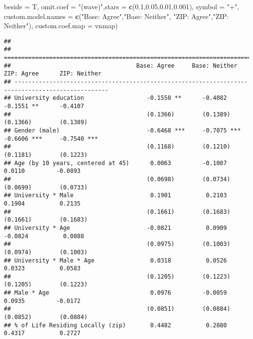 \documentclass[
]{article}
\newenvironment{Shaded}{\begin{snugshade}}{\end{snugshade}}
\newcommand{\DataTypeTok}[1]{\textcolor[rgb]{0.13,0.29,0.53}{#1}}
\newcommand{\FloatTok}[1]{\textcolor[rgb]{0.00,0.00,0.81}{#1}}
\newcommand{\KeywordTok}[1]{\textcolor[rgb]{0.13,0.29,0.53}{\textbf{#1}}}
\newcommand{\NormalTok}[1]{#1}
\newcommand{\StringTok}[1]{\textcolor[rgb]{0.31,0.60,0.02}{#1}}
\begin{document}
\begin{Shaded}
\begin{Highlighting}[]
          \DataTypeTok{beside =}\NormalTok{ T,}
          \DataTypeTok{omit.coef =} \StringTok{"(wave)"}\NormalTok{,}\DataTypeTok{stars =} \KeywordTok{c}\NormalTok{(}\FloatTok{0.1}\NormalTok{,}\FloatTok{0.05}\NormalTok{,}\FloatTok{0.01}\NormalTok{,}\FloatTok{0.001}\NormalTok{), }\DataTypeTok{symbol =} \StringTok{"+"}\NormalTok{, }
          \DataTypeTok{custom.model.names =} \KeywordTok{c}\NormalTok{(}\StringTok{"Base: Agree"}\NormalTok{,}\StringTok{"Base: Neither"}\NormalTok{,}
                                 \StringTok{"ZIP: Agree"}\NormalTok{,}\StringTok{"ZIP: Neither"}\NormalTok{),}
          \DataTypeTok{custom.coef.map =}\NormalTok{ vnmap)}
\end{Highlighting}
\end{Shaded}

\begin{verbatim}
## 
## =================================================================================================
##                                    Base: Agree     Base: Neither   ZIP: Agree      ZIP: Neither  
## -------------------------------------------------------------------------------------------------
## University education                  -0.1550 **      -0.4082         -0.1551 **      -0.4107    
##                                       (0.1366)        (0.1389)        (0.1366)        (0.1389)   
## Gender (male)                         -0.6468 ***     -0.7075 ***     -0.6606 ***     -0.7540 ***
##                                       (0.1168)        (0.1210)        (0.1181)        (0.1223)   
## Age (by 10 years, centered at 45)      0.0063         -0.1007          0.0110         -0.0893    
##                                       (0.0698)        (0.0734)        (0.0699)        (0.0733)   
## University * Male                      0.1901          0.2103          0.1904          0.2135    
##                                       (0.1661)        (0.1683)        (0.1661)        (0.1683)   
## University * Age                      -0.0821          0.0909         -0.0824          0.0888    
##                                       (0.0975)        (0.1003)        (0.0974)        (0.1003)   
## University * Male * Age                0.0318          0.0526          0.0323          0.0583    
##                                       (0.1205)        (0.1223)        (0.1205)        (0.1223)   
## Male * Age                             0.0976         -0.0059          0.0935         -0.0172    
##                                       (0.0851)        (0.0884)        (0.0852)        (0.0884)   
## % of Life Residing Locally (zip)       0.4482          0.2880          0.4317          0.2727    

\end{verbatim}
\end{document}
